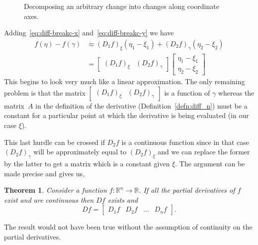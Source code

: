 \documentclass[11pt,reqno,openany]{amsbook}
\numberwithin{figure}{chapter}
\numberwithin{equation}{chapter}
\theoremstyle{plain}
\newtheorem{thm}{Theorem}[chapter]
\theoremstyle{definition}
\renewcommand{\Re}{\mathbb{R}}
\begin{document}
\begin{figure}
  \caption{Decomposing an arbitrary change into changes along coordinate axes.}
  \label{fig:diff-break-change}
\end{figure}

Adding~\eqref{eq:diff-breakc-x} and~\eqref{eq:diff-breakc-y}
we have
\begin{align*}
  f(\eta)-f(\gamma) &\approx (D_1 f)_\xi(\eta_1-\xi_1) 
  + (D_2 f)_\gamma (\eta_2-\xi_2)\\
  &=\begin{bmatrix} (D_1 f)_\xi & (D_2 f)_\gamma \end{bmatrix}
  \begin{bmatrix} \eta_1-\xi_1 \\ \eta_2-\xi_2 \end{bmatrix}
\end{align*}
This begins to look very much like a linear approximation.
The only remaining problem is that the matrix
$\begin{bmatrix} (D_1 f)_\xi & (D_2 f)_\gamma \end{bmatrix}$
is a function of $\gamma$ whereas the matrix~$A$ in the
definition of the derivative (Definition~\ref{defn:diff_n})
must be a constant for a particular point at which the
derivative is being evaluated (in our case $\xi$). 

This last hurdle can be crossed if $D_2 f$ is a continuous
function since in that case $(D_2 f)_\gamma$ will be
approximately equal to $(D_2 f)_\xi$ and we can replace the
former by the latter to get a matrix which is a constant
given $\xi$. The argument can be made precise and gives us,

\begin{thm}
  Consider a function $f\colon \Re^n \to \Re$. If all the
  partial derivatives of $f$ exist and are continuous then
  $Df$ exists and
  \[Df = \begin{bmatrix} 
    D_1 f & D_2 f & \hdots & D_n f
    \end{bmatrix}.\]
\end{thm}
The result would not have been true without the assumption
of continuity on the partial derivatives.
\end{document}
